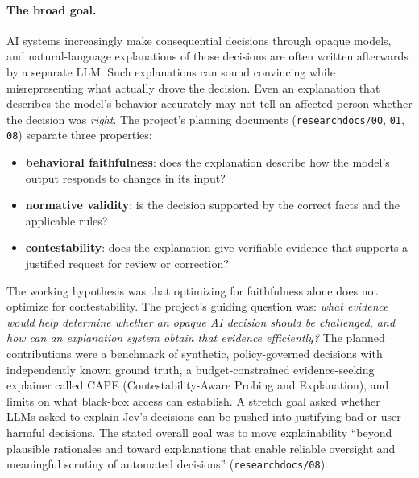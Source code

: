 \documentclass[11pt]{article}
\renewcommand{\_}{\origunderscore\allowbreak}
\begin{document}
\paragraph{The broad goal.} AI systems increasingly make consequential decisions through opaque models, and natural-language explanations of those decisions are often written afterwards by a separate LLM. Such explanations can sound convincing while misrepresenting what actually drove the decision. Even an explanation that describes the model's behavior accurately may not tell an affected person whether the decision was \emph{right}. The project's planning documents (\texttt{research\_docs/00}, \texttt{01}, \texttt{08}) separate three properties:
\begin{itemize}[leftmargin=*,itemsep=2pt]
  \item \textbf{behavioral faithfulness}: does the explanation describe how the model's output responds to changes in its input?
  \item \textbf{normative validity}: is the decision supported by the correct facts and the applicable rules?
  \item \textbf{contestability}: does the explanation give verifiable evidence that supports a justified request for review or correction?
\end{itemize}
The working hypothesis was that optimizing for faithfulness alone does not optimize for contestability. The project's guiding question was: \emph{what evidence would help determine whether an opaque AI decision should be challenged, and how can an explanation system obtain that evidence efficiently?} The planned contributions were a benchmark of synthetic, policy-governed decisions with independently known ground truth, a budget-constrained evidence-seeking explainer called CAPE (Contestability-Aware Probing and Explanation), and limits on what black-box access can establish. A stretch goal asked whether LLMs asked to explain Jev's decisions can be pushed into justifying bad or user-harmful decisions. The stated overall goal was to move explainability ``beyond plausible rationales and toward explanations that enable reliable oversight and meaningful scrutiny of automated decisions'' (\texttt{research\_docs/08}).
\end{document}
